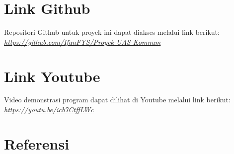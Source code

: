 \documentclass[conference]{IEEEtran}
\begin{document}
\section*{Link Github}
Repositori Github untuk proyek ini dapat diakses melalui link berikut:
\href{https://github.com/IfanFYS/Proyek-UAS-Komnum}{\textit{\underline{https://github.com/IfanFYS/Proyek-UAS-Komnum}}}

\section*{Link Youtube}
Video demonstrasi program dapat dilihat di Youtube melalui link berikut:
\href{https://youtu.be/icb7CtffLWc}{\textit{\underline{https://youtu.be/icb7CtffLWc}}}

\section*{Referensi}



\end{document}

